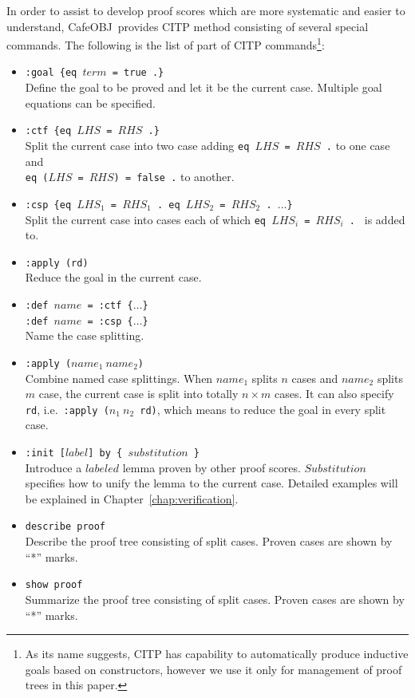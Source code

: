 \documentclass[12pt]{report}
\newcommand{\stt}[1]{{\small{\tt {#1}}}}
\newcommand{\cafeobj}{{\sf CafeOBJ}~}
\begin{document}
In order to assist to develop proof scores which are more systematic
and easier to understand, \cafeobj provides CITP method consisting of
several special commands. The following is the list of part of CITP
commands\footnote{As its name suggests, CITP has capability to
  automatically produce inductive goals based on constructors, however
  we use it only for management of proof trees in this paper.}:
\begin{itemize}
\item \stt{:goal \{eq $term$ = true .\}}\\ Define the goal to be
  proved and let it be the current case. Multiple goal equations
  can be specified.
\item \stt{:ctf \{eq $LHS$ = $RHS$ .\}}\\
  Split the current case into two case adding \stt{eq~$LHS$~=~$RHS$~.} to one case and\\
  \stt{eq~($LHS$~=~$RHS$)~=~false~.} to another.
\item \stt{:csp \{eq $LHS_1$ = $RHS_1$ . eq $LHS_2$ = $RHS_2$ . $\dots$\}}\\
  Split the current case into cases each of which
  \stt{eq~$LHS_i$~=~$RHS_i$~.~} is added to.
\item \stt{:apply (rd)}\\
 Reduce the goal in the current case.
\item \stt{:def $name$ = :ctf \{$\dots$\}}\\
  \stt{:def $name$ = :csp \{$\dots$\}}\\
  Name the case splitting.
\item \stt{:apply ($name_1\ name_2$)}\\ Combine named case
  splittings. When $name_1$ splits $n$ cases and $name_2$ splits $m$
  case, the current case is split into totally $n\times m$ cases.  It
  can also specify {\tt rd}, i.e.\ \stt{:apply~($n_1\ n_2$~rd)}, which
    means to reduce the goal in every split case.
\item \stt{:init [$label$] by \{ $substitution$ \}}\\
  Introduce a $labeled$ lemma proven by other proof scores. $Substitution$ specifies
  how to unify the lemma to the current case. Detailed examples will be explained
  in Chapter~\ref{chap:verification}.
\item \stt{describe proof}\\
 Describe the proof tree consisting of split cases. Proven cases are shown by ``*'' marks.
\item \stt{show proof}\\
Summarize the proof tree consisting of split cases. Proven cases are shown by ``*'' marks.
\end{itemize}
\end{document}
